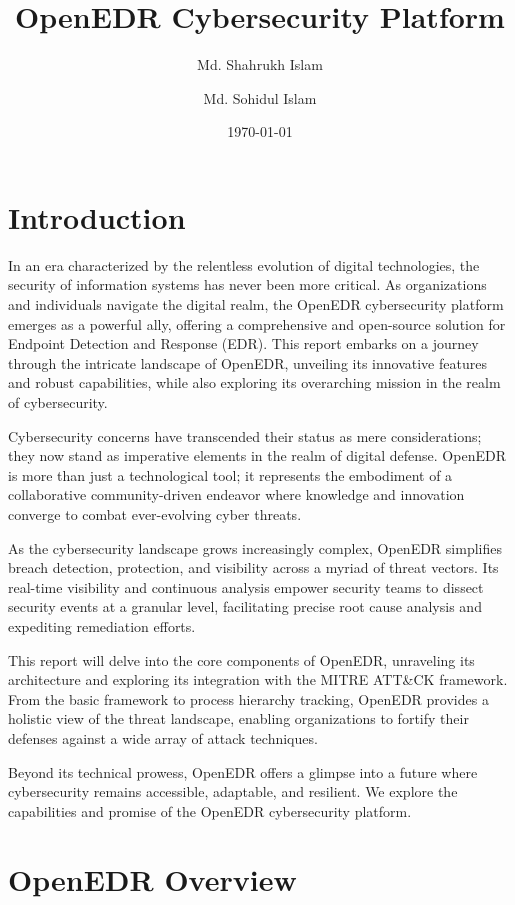 \documentclass{article}
\title{OpenEDR Cybersecurity Platform}
\author{Md. Shahrukh Islam \and Md. Sohidul Islam}
\date{\today}
\begin{document}
\maketitle

\section{Introduction}

In an era characterized by the relentless evolution of digital technologies, the security of information systems has never been more critical. As organizations and individuals navigate the digital realm, the OpenEDR cybersecurity platform emerges as a powerful ally, offering a comprehensive and open-source solution for Endpoint Detection and Response (EDR). This report embarks on a journey through the intricate landscape of OpenEDR, unveiling its innovative features and robust capabilities, while also exploring its overarching mission in the realm of cybersecurity.

Cybersecurity concerns have transcended their status as mere considerations; they now stand as imperative elements in the realm of digital defense. OpenEDR is more than just a technological tool; it represents the embodiment of a collaborative community-driven endeavor where knowledge and innovation converge to combat ever-evolving cyber threats.

As the cybersecurity landscape grows increasingly complex, OpenEDR simplifies breach detection, protection, and visibility across a myriad of threat vectors. Its real-time visibility and continuous analysis empower security teams to dissect security events at a granular level, facilitating precise root cause analysis and expediting remediation efforts.

This report will delve into the core components of OpenEDR, unraveling its architecture and exploring its integration with the MITRE ATT\&CK framework. From the basic framework to process hierarchy tracking, OpenEDR provides a holistic view of the threat landscape, enabling organizations to fortify their defenses against a wide array of attack techniques.

Beyond its technical prowess, OpenEDR offers a glimpse into a future where cybersecurity remains accessible, adaptable, and resilient. We explore the capabilities and promise of the OpenEDR cybersecurity platform.

\section{OpenEDR Overview}
\end{document}
